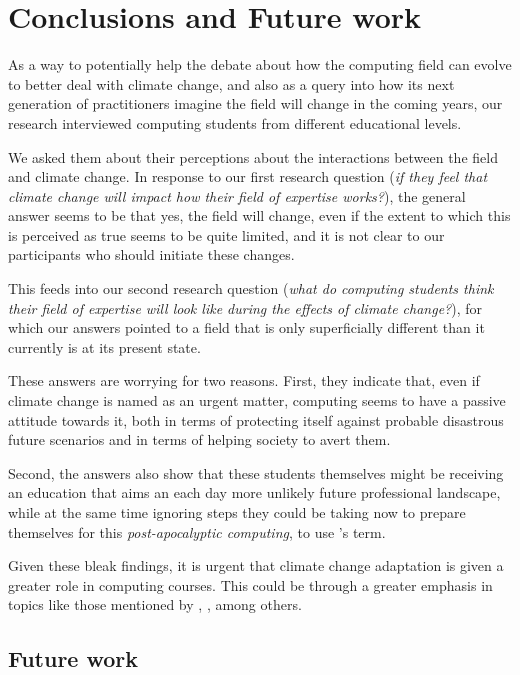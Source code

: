 
\section{Conclusions and Future work}
As a way to potentially help the debate about how the computing field can evolve to better deal with climate change, and also as a query into how its next generation of practitioners imagine the field will change in the coming years, our research interviewed computing students from different educational levels. 

We asked them about their perceptions about the interactions between the field and climate change. In response to our first research question (\emph{if they feel that climate change will impact how their field of expertise works?}), the general answer seems to be that yes, the field will change, even if the extent to which this is perceived as true seems to be quite limited, and it is not clear to our participants who should initiate these changes. 

This feeds into our second research question (\emph{what do computing students think their field of expertise will look like during the effects of climate change?}), for which our answers pointed to a field that is only superficially different than it currently is at its present state.

These answers are worrying for two reasons. First, they indicate that, even if climate change is named as an urgent matter, computing seems to have a passive attitude towards it, both in terms of protecting itself against probable disastrous future scenarios and in terms of helping society to avert them. 

Second, the answers also show that these students themselves might be receiving an education that aims an each day more unlikely future professional landscape, while at the same time ignoring steps they could be taking now to prepare themselves for this \emph{post-apocalyptic computing}, to use \citeauthor{silberman2010precarious}'s term.

Given these bleak findings, it is urgent that climate change adaptation is given a greater role in computing courses. This could be through a greater emphasis in topics like those mentioned by \citeauthor{silberman2010precarious}, \citeauthor{easterbrook2010climate}, among others. 

\subsection{Future work} 

